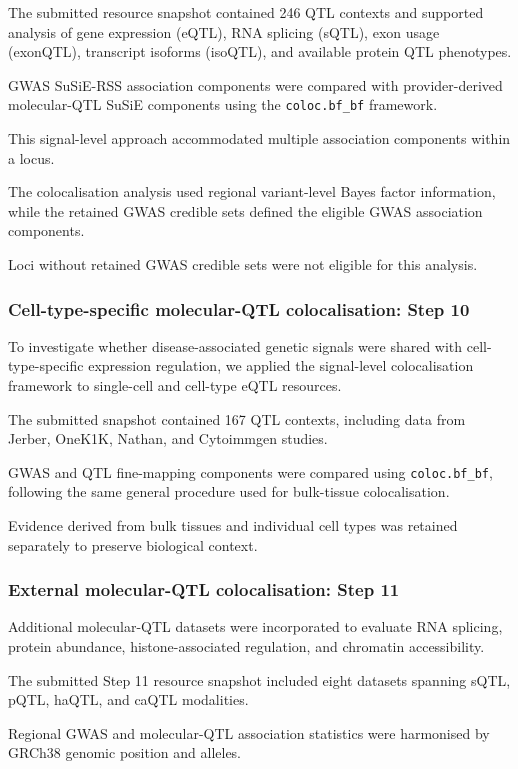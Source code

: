 \documentclass[11pt,a4paper]{article}
\begin{document}
The submitted resource snapshot contained 246 QTL
contexts and supported analysis of gene expression
(eQTL), RNA splicing (sQTL), exon usage (exonQTL),
transcript isoforms (isoQTL), and available protein
QTL phenotypes.

GWAS SuSiE-RSS association components were compared
with provider-derived molecular-QTL SuSiE components
using the \texttt{coloc.bf\_bf} framework.

This signal-level approach accommodated multiple
association components within a locus.

The colocalisation analysis used regional variant-level
Bayes factor information, while the retained GWAS
credible sets defined the eligible GWAS association
components.

Loci without retained GWAS credible sets were not
eligible for this analysis.


\subsubsection{Cell-type-specific molecular-QTL
colocalisation: Step 10}

To investigate whether disease-associated genetic signals
were shared with cell-type-specific expression regulation,
we applied the signal-level colocalisation framework
to single-cell and cell-type eQTL resources.

The submitted snapshot contained 167 QTL contexts,
including data from Jerber, OneK1K, Nathan,
and Cytoimmgen studies.

GWAS and QTL fine-mapping components were compared
using \texttt{coloc.bf\_bf}, following the same
general procedure used for bulk-tissue colocalisation.

Evidence derived from bulk tissues and individual
cell types was retained separately to preserve
biological context.


\subsubsection{External molecular-QTL colocalisation:
Step 11}

Additional molecular-QTL datasets were incorporated
to evaluate RNA splicing, protein abundance,
histone-associated regulation, and chromatin accessibility.

The submitted Step 11 resource snapshot included
eight datasets spanning sQTL, pQTL, haQTL, and caQTL
modalities.

Regional GWAS and molecular-QTL association statistics
were harmonised by GRCh38 genomic position and alleles.
\end{document}
